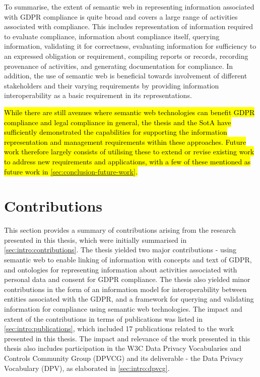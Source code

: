 To summarise, the extent of semantic web in representing information associated with GDPR compliance is quite broad and covers a large range of activities associated with compliance. This includes representation of information required to evaluate compliance, information about compliance itself, querying information, validating it for correctness, evaluating information for sufficiency to an expressed obligation or requirement, compiling reports or records, recording provenance of activities, and generating documentation for compliance. In addition, the use of semantic web is beneficial towards involvement of different stakeholders and their varying requirements by providing information interoperability as a basic requirement in its representations.

\hl{While there are still avenues where semantic web technologies can benefit GDPR compliance and legal compliance in general, the thesis and the SotA have sufficiently demonstrated the capabilities for supporting the information representation and management requirements within these approaches. Future work therefore largely consists of utilising these to extend or revise existing work to address new requirements and applications, with a few of these mentioned as future work in \autoref{sec:conclusion-future-work}.}

\section{Contributions}\label{sec:conclusion-contributions}
This section provides a summary of contributions arising from the research presented in this thesis, which were initially summarised in \autoref{sec:intro:contributions}.
The thesis yielded two major contributions - using semantic web to enable linking of information with concepts and text of GDPR, and ontologies for representing information about activities associated with personal data and consent for GDPR compliance. The thesis also yielded minor contributions in the form of an information model for interoperability between entities associated with the GDPR, and a framework for querying and validating information for compliance using semantic web technologies.
The impact and extent of the contributions in terms of publications was listed in \autoref{sec:intro:publications}, which included 17 publications related to the work presented in this thesis.
The impact and relevance of the work presented in this thesis also includes participation in the W3C Data Privacy Vocabularies and Controls Community Group (DPVCG) and its deliverable - the Data Privacy Vocabulary (DPV), as elaborated in \autoref{sec:intro:dpvcg}.


